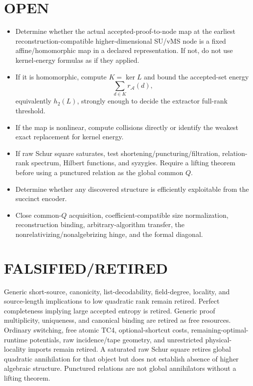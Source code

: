 \documentclass[11pt]{article}
\begin{document}
\section*{OPEN}
\begin{itemize}
\item Determine whether the actual accepted-proof-to-node map at the earliest reconstruction-compatible higher-dimensional SU/vMS node is a fixed affine/homomorphic map in a declared representation. If not, do not use kernel-energy formulas as if they applied.
\item If it is homomorphic, compute \(K=\ker L\) and bound the accepted-set energy
\[
\sum_{d\in K}r_{\mathcal A}(d),
\]
equivalently \(h_2(L)\), strongly enough to decide the extractor full-rank threshold.
\item If the map is nonlinear, compute collisions directly or identify the weakest exact replacement for kernel energy.
\item If raw Schur square saturates, test shortening/puncturing/filtration, relation-rank spectrum, Hilbert functions, and syzygies. Require a lifting theorem before using a punctured relation as the global common \(Q\).
\item Determine whether any discovered structure is efficiently exploitable from the succinct encoder.
\item Close common-\(Q\) acquisition, coefficient-compatible size normalization, reconstruction binding, arbitrary-algorithm transfer, the nonrelativizing/nonalgebrizing hinge, and the formal diagonal.
\end{itemize}

\section*{FALSIFIED/RETIRED}
Generic short-source, canonicity, list-decodability, field-degree, locality, and source-length implications to low quadratic rank remain retired. Perfect completeness implying large accepted entropy is retired. Generic proof multiplicity, uniqueness, and canonical binding are retired as free resources. Ordinary switching, free atomic TC4, optional-shortcut costs, remaining-optimal-runtime potentials, raw incidence/tape geometry, and unrestricted physical-locality imports remain retired. A saturated raw Schur square retires global quadratic annihilation for that object but does not establish absence of higher algebraic structure. Punctured relations are not global annihilators without a lifting theorem.
\end{document}
